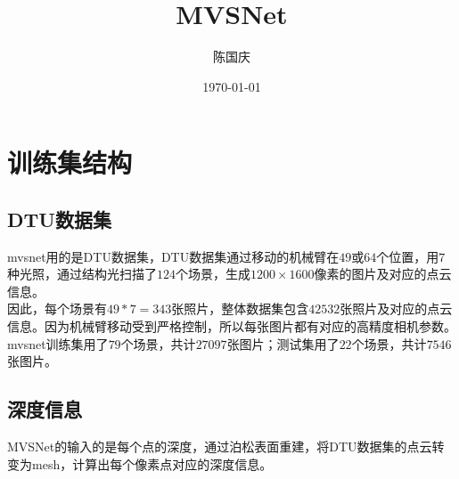 \documentclass[hpyerref,UTF8,a4paper,titlepage,12pt,oneside]{ctexbook}
\title{MVSNet}
\author{陈国庆}
\date{\today}
\theoremstyle{definition}
\begin{document}
\maketitle

\section{训练集结构}
	
	\subsection*{DTU数据集} 
		mvsnet用的是DTU数据集，DTU数据集通过移动的机械臂在$49$或$64$个位置，用$7$种光照，通过结构光扫描了$124$个场景，生成$1200 \times 1600$像素的图片及对应的点云信息。\\

		因此，每个场景有$49 * 7 = 343$张照片，整体数据集包含$42532$张照片及对应的点云信息。因为机械臂移动受到严格控制，所以每张图片都有对应的高精度相机参数。\\

		mvsnet训练集用了$79$个场景，共计$27097$张图片；测试集用了$22$个场景，共计$7546$张图片。
	
	\subsection*{深度信息}
		MVSNet的输入的是每个点的深度，通过泊松表面重建，将DTU数据集的点云转变为mesh，计算出每个像素点对应的深度信息。
\end{document}
